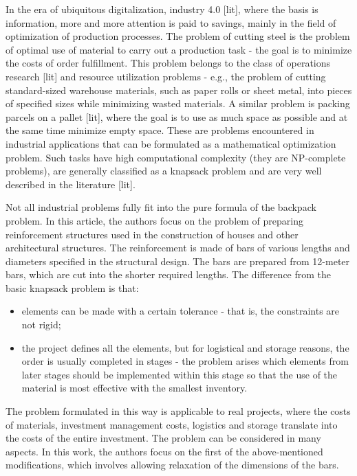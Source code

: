 In the era of ubiquitous digitalization, industry 4.0 [lit], where the basis is information, more and more attention is paid to savings, mainly in the field of optimization of production processes. The problem of cutting steel is the problem of optimal use of material to carry out a production task - the goal is to minimize the costs of order fulfillment. This problem belongs to the class of operations research [lit] and resource utilization problems - e.g., the problem of cutting standard-sized warehouse materials, such as paper rolls or sheet metal, into pieces of specified sizes while minimizing wasted materials. A similar problem is packing parcels on a pallet [lit], where the goal is to use as much space as possible and at the same time minimize empty space. These are problems encountered in industrial applications that can be formulated as a mathematical optimization problem. Such tasks have high computational complexity (they are NP-complete problems), are generally classified as a knapsack problem and are very well described in the literature [lit].

Not all industrial problems fully fit into the pure formula of the backpack problem. In this article, the authors focus on the problem of preparing reinforcement structures used in the construction of houses and other architectural structures. The reinforcement is made of bars of various lengths and diameters specified in the structural design. The bars are prepared from 12-meter bars, which are cut into the shorter required lengths. The difference from the basic knapsack problem is that:
\begin{itemize}
\item elements can be made with a certain tolerance - that is, the constraints are not rigid;
\item the project defines all the elements, but for logistical and storage reasons, the order is usually completed in stages - the problem arises which elements from later stages should be implemented within this stage so that the use of the material is most effective with the smallest inventory.
\end{itemize}

The problem formulated in this way is applicable to real projects, where the costs of materials, investment management costs, logistics and storage translate into the costs of the entire investment. The problem can be considered in many aspects. In this work, the authors focus on the first of the above-mentioned modifications, which involves allowing relaxation of the dimensions of the bars.

